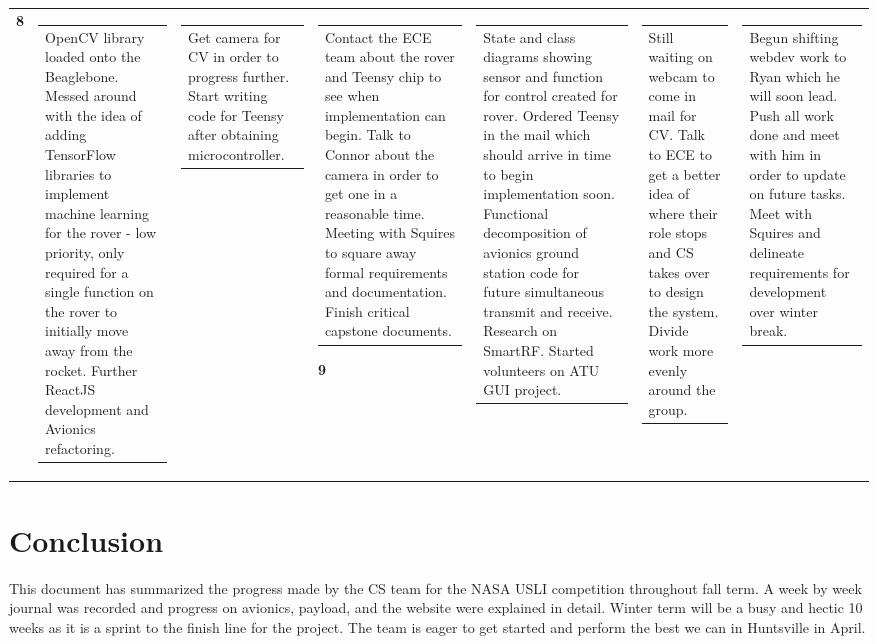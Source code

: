 \documentclass[journal,10pt,draftclsnofoot,onecolumn,compsoc]{IEEEtran} \usepackage[margin=0.75in]{geometry}
\begin{document}
\begin{landscape}
\begin{longtable}{p{1cm}|p{7cm}|p{7cm}|l}
\textbf{8} & \begin{tabular}{p{6.5cm}} OpenCV library loaded onto the Beaglebone. Messed around with the idea of adding TensorFlow libraries to implement machine learning for the rover - low priority, only required for a single function on the rover to initially move away from the rocket. Further ReactJS development and Avionics refactoring.  \end{tabular} & \begin{tabular}{p{6.5cm}} Get camera for CV in order to progress further. Start writing code for Teensy after obtaining microcontroller.  \end{tabular} & \begin{tabular}{p{6.5cm}} Contact the ECE team about the rover and Teensy chip to see when implementation can begin. Talk to Connor about the camera in order to get one in a reasonable time. Meeting with Squires to square away formal requirements and documentation. Finish critical capstone documents. \end{tabular} \hline

\textbf{9} & \begin{tabular}{p{6.5cm}} State and class diagrams showing sensor and function for control created for rover. Ordered Teensy in the mail which should arrive in time to begin implementation soon. Functional decomposition of avionics ground station code for future simultaneous transmit and receive. Research on SmartRF. Started volunteers on ATU GUI project.  \end{tabular} & \begin{tabular}{p{6.5cm}} Still waiting on webcam to come in mail for CV. Talk to ECE to get a better idea of where their role stops and CS takes over to design the system. Divide work more evenly around the group.  \end{tabular} & \begin{tabular}{p{6.5cm}} Begun shifting webdev work to Ryan which he will soon lead. Push all work done and meet with him in order to update on future tasks. Meet with Squires and delineate requirements for development over winter break. \end{tabular} \hline

\end{longtable}

\end{landscape}

\section{Conclusion}
This document has summarized the progress made by the CS team for the NASA USLI competition throughout fall term. A week by week journal was recorded and progress on avionics, payload, and the website were explained in detail. Winter term will be a busy and hectic 10 weeks as it is a sprint to the finish line for the project. The team is eager to get started and perform the best we can in Huntsville in April.  
\end{document}
